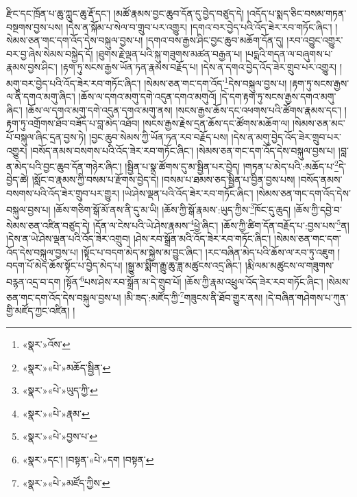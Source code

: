 རྫིང་དང་ཁྲོན་པ་ཆུ་ཀླུང་ཆུ་རྡོ་དང་། །མཚོ་རྣམས་བྱང་ཆུབ་དོན་དུ་བྱེད་བཙུད་དེ། །འདོད་པ་སྨད་ཅིང་བསམ་གཏན་བསྔགས་བྱས་པས། །དེས་ན་སྐོམ་པ་སེལ་བ་གྲུབ་པར་འགྱུར། །དགའ་བར་བྱེད་པའི་འོད་ཟེར་རབ་གཏོང་ཞིང་། །སེམས་ཅན་གང་དག་འོད་དེས་བསྐུལ་བྱས་པ། །དགའ་བས་རྒྱས་ཤིང་བྱང་ཆུབ་མཆོག་དོན་དུ། །རབ་འབྱུང་འགྱུར་བར་བྱ་ཞེས་སེམས་བསྐྱེད་དོ། །ཐུགས་རྗེ་ལྡན་པའི་སྐུ་གཟུགས་མཚན་བརྒྱན་པ། །པདྨའི་གདན་ལ་བཞུགས་པ་རྣམས་བྱས་ཤིང་། །རྟག་ཏུ་སངས་རྒྱས་ཡོན་ཏན་རྣམས་བརྗོད་པ། །དེས་ན་དགའ་བྱེད་འོད་ཟེར་གྲུབ་པར་འགྱུར། །མགུ་བར་བྱེད་པའི་འོད་ཟེར་རབ་གཏོང་ཞིང་། །སེམས་ཅན་གང་དག་འོད་\footnote{«སྣར་»འོས་}དེས་བསྐུལ་བྱས་པ། །རྟག་ཏུ་སངས་རྒྱས་ལ་ནི་དགའ་མགུ་ཞིང་། །ཆོས་ལ་དགའ་མགུ་དགེ་འདུན་དགའ་མགུའོ། །དེ་དག་རྟག་ཏུ་སངས་རྒྱས་དགའ་མགུ་ཞིང་། །ཆོས་ལ་དགའ་མགུ་དགེ་འདུན་དགའ་མགུ་ནས། །སངས་རྒྱས་ཆོས་དང་འཕགས་པའི་ཚོགས་རྣམས་དང་། །རྟག་ཏུ་འགྲོགས་ཐོབ་བཟོད་པ་བླ་མེད་འཐོབ། །སངས་རྒྱས་རྗེས་དྲན་ཆོས་དང་ཚོགས་མཆོག་ལ། །སེམས་ཅན་མང་པོ་བསྐུལ་ཞིང་དྲན་བྱས་ཏེ། །བྱང་ཆུབ་སེམས་ཀྱི་ཡོན་ཏན་རབ་བརྗོད་པས། །དེས་ན་མགུ་བྱེད་འོད་ཟེར་གྲུབ་པར་འགྱུར། །བསོད་ནམས་བསགས་པའི་འོད་ཟེར་རབ་གཏོང་ཞིང་། །སེམས་ཅན་གང་དག་འོད་དེས་བསྐུལ་བྱས་པ། །བླ་ན་མེད་པའི་བྱང་ཆུབ་དོན་གཉེར་ཞིང་། །སྦྱིན་པ་སྣ་ཚོགས་དུ་མ་སྦྱིན་པར་བྱེད། །གཏན་པ་མེད་པའི་:མཆོད་པ་\footnote{«སྣར་»«པེ་»མཆོད་སྦྱིན་}དེ་བྱེད་ཚེ། །སློང་བ་རྣམས་ཀྱི་བསམ་པ་རྫོགས་བྱེད་དེ། །བསམ་པ་ཐམས་ཅད་སྦྱིན་པ་བྱིན་བྱས་པས། །བསོད་ནམས་བསགས་པའི་འོད་ཟེར་གྲུབ་པར་གྱུར། །ཡེ་ཤེས་ལྡན་པའི་འོད་ཟེར་རབ་གཏོང་ཞིང་། །སེམས་ཅན་གང་དག་འོད་དེས་བསྐུལ་བྱས་པ། །ཆོས་གཅིག་སྒོ་མོ་ནས་ནི་དུ་མ་ཡི། །ཆོས་ཀྱི་སྒོ་རྣམས་:ཡུད་ཀྱིས་\footnote{«སྣར་»«པེ་»ཡུད་ཀྱི་}ཁོང་དུ་ཆུད། །ཆོས་ཀྱི་དབྱེ་བ་སེམས་ཅན་འཛིན་བཙུད་དེ། །དོན་ལ་ངེས་པའི་ཡེ་ཤེས་རྣམས་\footnote{«སྣར་»«པེ་»རྣམ་}ཕྱེ་ཞིང་། །ཆོས་ཀྱི་ཚིག་དོན་བརྗོད་པ་:བྱས་པས་\footnote{«སྣར་»«པེ་»བྱས་པ་}ན། །དེས་ན་ཡེ་ཤེས་ལྡན་པའི་འོད་ཟེར་འགྲུབ། །ཤེས་རབ་སྒྲོན་མའི་འོད་ཟེར་རབ་གཏོང་ཞིང་། །སེམས་ཅན་གང་དག་འོད་དེས་བསྐུལ་བྱས་པ། །སྟོང་པ་བདག་མེད་མ་སྐྱེས་མ་བྱུང་ཞིང་། །རང་བཞིན་མེད་པའི་ཆོས་ལ་རབ་ཏུ་འཇུག །བདག་པོ་མེད་ཆོས་སྟོང་པ་བྱེད་མེད་པ། །སྒྱུ་མ་སྨིག་རྒྱུ་ཆུ་ཟླ་མཚུངས་འདྲ་ཞིང་། །རྨི་ལམ་མཚུངས་ལ་གཟུགས་བརྙན་འདྲ་བ་དག །སྟོན་\footnote{«སྣར་»དང་། །བསྟན་«པེ་»དག །བསྟན་}པས་ཤེས་རབ་སྒྲོན་མ་དེ་གྲུབ་པོ། །ཆོས་ཀྱི་རྣམ་འཕྲུལ་འོད་ཟེར་རབ་གཏོང་ཞིང་། །སེམས་ཅན་གང་དག་འོད་དེས་བསྐུལ་བྱས་པ། །མི་ཟད་:མཛོད་ཀྱི་\footnote{«སྣར་»«པེ་»མཛོད་ཀྱིས་}གཟུངས་ནི་ཐོབ་གྱུར་ནས། །དེ་བཞིན་གཤེགས་པ་ཀུན་གྱི་མཛོད་ཀྱང་འཛིན། །
